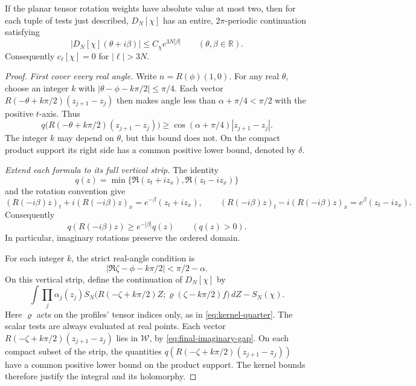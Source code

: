 \documentclass[11pt, letterpaper, reqno]{amsart}
\theoremstyle{definition}
\newenvironment{proposition}
{\pushQED{\qed}\renewcommand{\qedsymbol}{$\blacksquare$}\propositionx}
{\popQED\endpropositionx}
\theoremstyle{remark}
\newcommand{\bbR}{\mathbb{R}}
\newcommand{\calW}{\mathcal{W}}
\begin{document}
\begin{proposition}\label{prop:final-growth}
If the planar tensor rotation weights have absolute value at most two,
then for each tuple of tests just described, $D_N[\chi]$ has an entire,
$2\pi$-periodic continuation satisfying
\begin{equation}\label{eq:final-growth}
 |D_N[\chi](\theta+i\beta)|\le C_\chi e^{3N|\beta|}
 \qquad(\theta,\beta\in\bbR).
\end{equation}
Consequently $c_\ell[\chi]=0$ for $|\ell|>3N$.
\end{proposition}

\begin{proof}
\emph{First cover every real angle.}
Write $n=R(\phi)(1,0)$. For any real $\theta$, choose an integer $k$ with
$|\theta-\phi-k\pi/2|\le\pi/4$. Each vector
$R(-\theta+k\pi/2)(z_{j+1}-z_j)$ then makes angle less than
$\alpha+\pi/4<\pi/2$ with the positive $t$-axis.
Thus
\begin{equation}\label{eq:final-real-gap}
 q\bigl(R(-\theta+k\pi/2)(z_{j+1}-z_j)\bigr)
 \ge \cos(\alpha+\pi/4)|z_{j+1}-z_j|.
\end{equation}
The integer $k$ may depend on $\theta$, but this bound does not. On the compact
product support its right side has a common positive lower bound,
denoted by $\delta$.

\emph{Extend each formula to its full vertical strip.}
The identity
\[
 q(z)=\min\{\Re(z_t+iz_x),\Re(z_t-iz_x)\}
\]
and the rotation convention give
\[
 (R(-i\beta)z)_t+i(R(-i\beta)z)_x=e^{-\beta}(z_t+iz_x),
 \qquad
 (R(-i\beta)z)_t-i(R(-i\beta)z)_x=e^{\beta}(z_t-iz_x).
\]
Consequently
\begin{equation}\label{eq:final-imaginary-gap}
 q(R(-i\beta)z)\ge e^{-|\beta|}q(z)\qquad(q(z)>0).
\end{equation}
In particular, imaginary rotations preserve the ordered domain.

For each integer $k$, the strict real-angle condition is
\begin{equation}\label{eq:final-strips}
 |\Re\zeta-\phi-k\pi/2|<\pi/2-\alpha.
\end{equation}
On this vertical strip, define the continuation of $D_N[\chi]$ by
\begin{equation}\label{eq:final-chart}
 \int\prod_j\alpha_j(z_j)
 S_N\bigl(R(-\zeta+k\pi/2)Z;
              \varrho(\zeta-k\pi/2)f\bigr)\,dZ-S_N(\chi).
\end{equation}
Here $\varrho$ acts on the profiles' tensor indices only, as in
\eqref{eq:kernel-quarter}.
The scalar tests are always evaluated at real points. Each vector
$R(-\zeta+k\pi/2)(z_{j+1}-z_j)$ lies in $\calW$, by
\eqref{eq:final-imaginary-gap}. On each compact subset of the strip,
the quantities $q(R(-\zeta+k\pi/2)(z_{j+1}-z_j))$ have a common
positive lower bound on the product support. The kernel bounds
therefore justify the integral and its holomorphy.


\end{proof}
\end{document}
